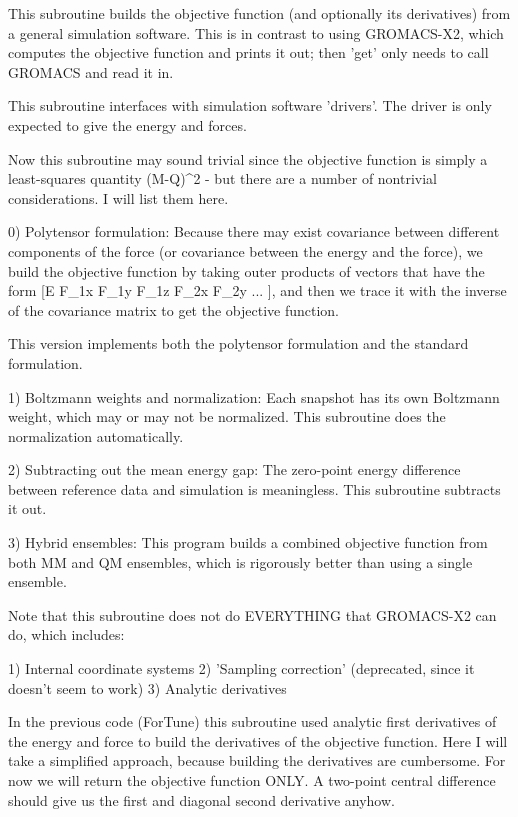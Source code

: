 \begin{DoxyVerb}     This subroutine builds the objective function (and optionally
     its derivatives) from a general simulation software.  This is
     in contrast to using GROMACS-X2, which computes the objective
     function and prints it out; then 'get' only needs to call
     GROMACS and read it in.

     This subroutine interfaces with simulation software 'drivers'.
     The driver is only expected to give the energy and forces.

     Now this subroutine may sound trivial since the objective
     function is simply a least-squares quantity (M-Q)^2 - but
     there are a number of nontrivial considerations.  I will list
     them here.

     0) Polytensor formulation: Because there may exist covariance
     between different components of the force (or covariance
     between the energy and the force), we build the objective
     function by taking outer products of vectors that have the
     form [E F_1x F_1y F_1z F_2x F_2y ... ], and then we trace it
     with the inverse of the covariance matrix to get the objective
     function.

     This version implements both the polytensor formulation and the standard formulation.

     1) Boltzmann weights and normalization: Each snapshot has its
     own Boltzmann weight, which may or may not be normalized.
     This subroutine does the normalization automatically.

     2) Subtracting out the mean energy gap: The zero-point energy
     difference between reference data and simulation is
     meaningless.  This subroutine subtracts it out.

     3) Hybrid ensembles: This program builds a combined objective
     function from both MM and QM ensembles, which is rigorously
     better than using a single ensemble.

     Note that this subroutine does not do EVERYTHING that
     GROMACS-X2 can do, which includes:

     1) Internal coordinate systems
     2) 'Sampling correction' (deprecated, since it doesn't seem to work)
     3) Analytic derivatives

     In the previous code (ForTune) this subroutine used analytic
     first derivatives of the energy and force to build the
     derivatives of the objective function.  Here I will take a
     simplified approach, because building the derivatives are
     cumbersome.  For now we will return the objective function
     ONLY.  A two-point central difference should give us the first
     and diagonal second derivative anyhow.
\end{DoxyVerb}


